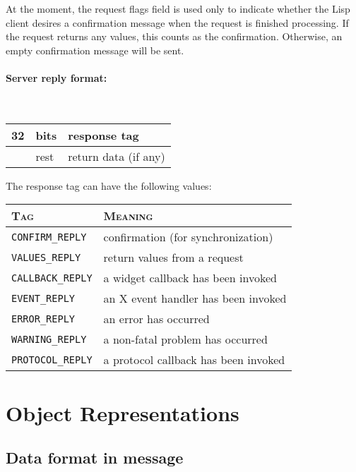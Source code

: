 \documentclass{article}
\begin{document}
At the moment, the request flags field is used only to indicate whether
the Lisp client desires a confirmation message when the request is finished
processing.  If the request returns any values, this counts as the
confirmation.  Otherwise, an empty confirmation message will be sent.

\paragraph{Server reply format:}{\ }\\[2mm]
\begin{center}
\begin{tabular}{|rl|l|}
\hline
	32 & bits & response tag\\\hline
	   & rest & return data (if any)\\\hline
\end{tabular}
\end{center}

\noindent
The response tag can have the following values:\\[2mm]
\begin{center}
\begin{tabular}{|l|l|}
\hline
\textsc{Tag} & \textsc{Meaning}\\\hline\hline
	\texttt{CONFIRM\_REPLY}  & confirmation (for synchronization)\\\hline
	\texttt{VALUES\_REPLY}   & return values from a request\\\hline
	\texttt{CALLBACK\_REPLY} & a widget callback has been invoked\\\hline
	\texttt{EVENT\_REPLY}    & an X event handler has been invoked\\\hline
	\texttt{ERROR\_REPLY}    & an error has occurred\\\hline
	\texttt{WARNING\_REPLY}  & a non-fatal problem has occurred\\\hline
	\texttt{PROTOCOL\_REPLY} & a protocol callback has been invoked\\\hline
\end{tabular}
\end{center}


\section{Object Representations}

\subsection{Data format in message}
\end{document}

